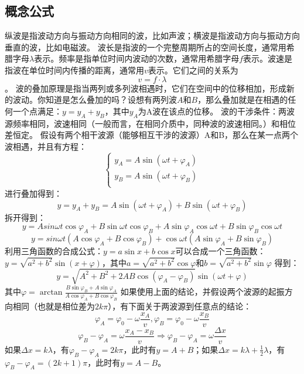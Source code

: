 \documentclass{lesson}
\begin{document}
\subsection{概念公式}
纵波是指波动方向与振动方向相同的波，比如声波；横波是指波动方向与振动方向垂直的波，比如电磁波。
波长是指波的一个完整周期所占的空间长度，通常用希腊字母$\lambda$表示。频率是指单位时间内波动的次数，通常用希腊字母$f$表示。波速是指波在单位时间内传播的距离，通常用$v$表示。它们之间的关系为\[v = f \cdot \lambda\]。
波的叠加原理是指当两列或多列波相遇时，它们在空间中的位移相加，形成新的波动。你知道是怎么叠加的吗？设想有两列波$A$和$B$，那么叠加就是在相遇的任何一个点满足：$y=y_A+y_B$，其中$y_A$为A波在该点的位移。
波的干涉条件：两波源频率相同，波速相同（一般而言，在相同介质中，同种波的波速相同。）和相位差恒定。
假设有两个相干波源（能够相互干涉的波源）A和B，那么在某一点两个波相遇，并且有方程：
\[\left\{
	\begin{array}{l}
		y_A=A\sin(\omega t+\varphi_A) \\
		y_B=A\sin(\omega t+\varphi_B) \\
	\end{array}
	\right.\]
进行叠加得到：
\[y=y_A+y_B=A\sin(\omega t+\varphi_A)+B\sin(\omega t+\varphi_B)\]
拆开得到：
\[y=Asin\omega t\cos\varphi_A+B\sin\omega t\cos\varphi_B+A\sin\varphi_A\cos\omega t+B\sin\varphi_B\cos\omega t\]
\[y=sin\omega t(A\cos\varphi_A+B\cos\varphi_B)+\cos\omega t(A\sin\varphi_A+B\sin\varphi_B)\]
利用三角函数的合成公式：$y=a\sin x+b\cos x$可以合成一个三角函数：$y=\sqrt{a^2+b^2}\sin(x+\varphi)$，其中$a=\sqrt{a^2+b^2}\cos\varphi$和$b=\sqrt{a^2+b^2}\sin\varphi$
得到：
\[y=\sqrt{A^2+B^2+2AB\cos(\varphi_A-\varphi_B)}\sin(\omega t + \varphi)\]
其中$\varphi=\arctan\frac{B\sin\varphi_B+A\sin\varphi_A}{A\cos\varphi_A+B\cos\varphi_B}$
如果使用上面的结论，并假设两个波源的起振方向相同（也就是相位差为$2k\pi$），有下面关于两波源到任意点的结论：
\[\varphi_A=\varphi_0-\omega\frac {x_A}v,\varphi_B=\varphi_0-\omega\frac {x_B}v\]
\[\varphi_B-\varphi_A=\omega\frac{x_A-x_B}{v}\Rightarrow\varphi_B-\varphi_A=\omega\frac{\Delta x}{v}\]
如果$\Delta x=k\lambda$，有$\varphi_B-\varphi_A=2k\pi$，此时有$y=A+B$；如果$\Delta x=k\lambda+\frac12\lambda$，有$\varphi_B-\varphi_A=(2k+1)\pi$，此时有$y=A-B$。
\end{document}
